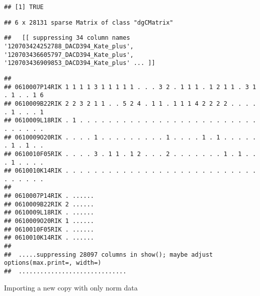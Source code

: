 \documentclass[
]{article}
\newenvironment{Shaded}{\begin{snugshade}}{\end{snugshade}}
\newcommand{\AttributeTok}[1]{\textcolor[rgb]{0.13,0.29,0.53}{#1}}
\newcommand{\CommentTok}[1]{\textcolor[rgb]{0.56,0.35,0.01}{\textit{#1}}}
\newcommand{\ConstantTok}[1]{\textcolor[rgb]{0.56,0.35,0.01}{#1}}
\newcommand{\FunctionTok}[1]{\textcolor[rgb]{0.13,0.29,0.53}{\textbf{#1}}}
\newcommand{\NormalTok}[1]{#1}
\newcommand{\OtherTok}[1]{\textcolor[rgb]{0.56,0.35,0.01}{#1}}
\newcommand{\SpecialCharTok}[1]{\textcolor[rgb]{0.81,0.36,0.00}{\textbf{#1}}}
\begin{document}
\begin{verbatim}
## [1] TRUE
\end{verbatim}

\begin{Shaded}
\end{Shaded}

\begin{verbatim}
## 6 x 28131 sparse Matrix of class "dgCMatrix"
\end{verbatim}

\begin{verbatim}
##   [[ suppressing 34 column names '120703424252788_DACD394_Kate_plus', '120703436605797_DACD394_Kate_plus', '120703436909853_DACD394_Kate_plus' ... ]]
\end{verbatim}

\begin{verbatim}
##                                                                                
## 0610007P14RIK 1 1 1 1 3 1 1 1 1 1 . . . 3 2 . 1 1 1 . 1 2 1 1 . 3 1 . 1 . . 1 6
## 0610009B22RIK 2 2 3 2 1 1 . . 5 2 4 . 1 1 . 1 1 1 4 2 2 2 2 . . . . . 1 . . . 1
## 0610009L18RIK . 1 . . . . . . . . . . . . . . . . . . . . . . . . . . . . . . .
## 0610009O20RIK . . . . 1 . . . . . . . . . 1 . . . . 1 . 1 . . . . . . 1 . 1 . .
## 0610010F05RIK . . . . 3 . 1 1 . 1 2 . . . 2 . . . . . . . 1 . 1 . . . 1 . . . .
## 0610010K14RIK . . . . . . . . . . . . . . . . . . . . . . . . . . . . . . . . .
##                       
## 0610007P14RIK . ......
## 0610009B22RIK 2 ......
## 0610009L18RIK . ......
## 0610009O20RIK 1 ......
## 0610010F05RIK . ......
## 0610010K14RIK . ......
## 
##  .....suppressing 28097 columns in show(); maybe adjust options(max.print=, width=)
##  ..............................
\end{verbatim}

Importing a new copy with only norm data

\begin{Shaded}
\end{Shaded}
\end{document}
